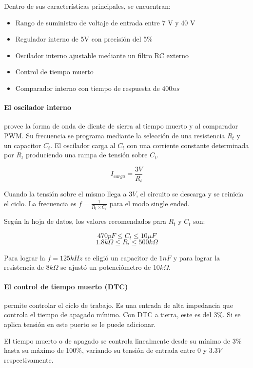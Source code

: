 Dentro de sus características principales, se encuentran:
\begin{itemize}
    \item Rango de suministro de voltaje de entrada entre 7 V y 40 V
    \item Regulador interno de 5V con precisión del 5\%
    \item Oscilador interno ajustable mediante un filtro RC externo
    \item Control de tiempo muerto
    \item Comparador interno con tiempo de respuesta de $400ns$
\end{itemize}


\paragraph{El oscilador interno} provee la forma de onda de diente de sierra al tiempo muerto y al comparador PWM. 
Su frecuencia se programa mediante la selección de una resistencia $R_t$ y un capacitor $C_t$. 
El oscilador carga al $C_t$ con una corriente constante determinada por $R_t$ produciendo una rampa de tensión sobre $C_t$.

$$ I_{carga}=\frac{3V}{R_t} $$

Cuando la tensión sobre el mismo llega a $3V$, el circuito se descarga y se reinicia el ciclo. 
La frecuencia es $f=\frac{1}{R_t\times C_t}$ para el modo single ended.

Según la hoja de datos, los valores recomendados para $R_t$ y $C_t$ son:

$$470pF\leq C_t\leq 10\mu F$$
$$1.8k\Omega\leq R_t\leq 500k\Omega$$

Para lograr la $f=125kHz$ se eligió un capacitor de $1nF$ y para lograr la resistencia de $8k\Omega$ se ajustó un potenciómetro de $10k\Omega$. 

\paragraph{El control de tiempo muerto (DTC)} permite controlar el ciclo de trabajo. 
Es una entrada de alta impedancia que controla el tiempo de apagado mínimo. Con DTC a tierra, este es del 3\%.
Si se aplica tensión en este puerto se le puede adicionar.

El tiempo muerto o de apagado se controla linealmente desde su mínimo de 3\% hasta su máximo de 100\%, 
variando su tensión de entrada entre $0$ y $3.3V$ respectivamente. 

